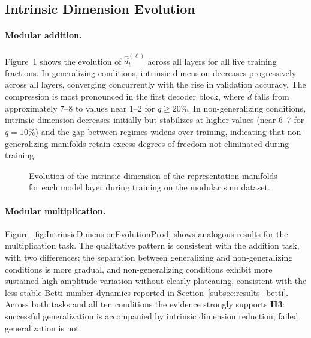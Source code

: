 \subsection{Intrinsic Dimension Evolution}
\label{subsec:results_id}

\paragraph{Modular addition.}
Figure~\ref{fig:IntrinsicDimensionEvolutionSum} shows the evolution of $\hat{d}^{(\ell)}_t$ across all layers for all five training fractions. In generalizing conditions, intrinsic dimension decreases progressively across all layers, converging concurrently with the rise in validation accuracy. The compression is most pronounced in the first decoder block, where $\hat{d}$ falls from approximately 7--8 to values near 1--2 for $q \geq 20\%$. In non-generalizing conditions, intrinsic dimension decreases initially but stabilizes at higher values  (near 6--7 for $q = 10\%$) and the gap between regimes widens over training, indicating that non-generalizing manifolds retain excess degrees of freedom not eliminated during training.

\begin{figure}[htbp]
    \centering
     
     
     
    \caption[Intrinsic dimension evolution (Modular Sum).]{Evolution of the intrinsic dimension of the representation manifolds for each model layer during training on the modular sum dataset.}
    \label{fig:IntrinsicDimensionEvolutionSum}
\end{figure}


\paragraph{Modular multiplication.}
Figure~\ref{fig:IntrinsicDimensionEvolutionProd} shows analogous results for the multiplication task. The qualitative pattern is consistent with the addition task, with two differences: the separation between generalizing and non-generalizing conditions is more gradual, and non-generalizing conditions exhibit more sustained high-amplitude variation without clearly plateauing, consistent with the less stable Betti number dynamics reported in Section~\ref{subsec:results_betti}. Across both tasks and all ten conditions the evidence strongly supports \textbf{H3}: successful generalization is accompanied by intrinsic dimension reduction; failed generalization is not. %

